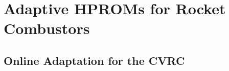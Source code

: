 \chapter{Adaptive HPROMs for Rocket Combustors}
\label{chap:AdaptiveResults}



\section{Online Adaptation for the CVRC}

